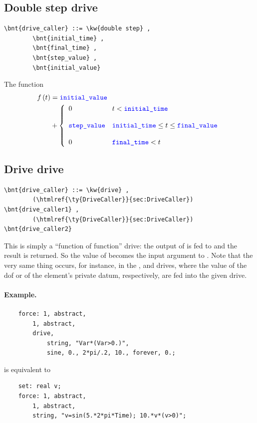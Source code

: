 \subsection{Double step drive}
\begin{Verbatim}[commandchars=\\\{\}]
    \bnt{drive_caller} ::= \kw{double step} ,
        \bnt{initial_time} , 
        \bnt{final_time} ,
        \bnt{step_value} , 
        \bnt{initial_value}
\end{Verbatim}
The function
\begin{align}
	f\plbr{t} &= \nt{initial\_value} \nonumber \\
	&+ \lcubr{\matr{ll}{
		0
			& t < \nt{initial\_time} \\
		\\
		\nt{step\_value}
			& \nt{initial\_time} \le t \le \nt{final\_value} \\
		\\
		0 
			& \nt{final\_time} < t
	}}
\end{align}

\subsection{Drive drive}
\begin{Verbatim}[commandchars=\\\{\}]
    \bnt{drive_caller} ::= \kw{drive} ,
        (\htmlref{\ty{DriveCaller}}{sec:DriveCaller}) \bnt{drive_caller1} , 
        (\htmlref{\ty{DriveCaller}}{sec:DriveCaller}) \bnt{drive_caller2}
\end{Verbatim}
This is simply a ``function of function'' drive: the output 
of  is fed to 
and the result is returned.
So the value of  becomes the input argument
to .
Note that the very same thing occurs, for instance, in the
,  and  drives, where the value of the dof
or of the element's private datum, respectively, are fed 
into the given drive.

\paragraph{Example.}
\begin{verbatim}
    force: 1, abstract,
        1, abstract,
        drive,
            string, "Var*(Var>0.)",
            sine, 0., 2*pi/.2, 10., forever, 0.;
\end{verbatim}
is equivalent to
\begin{verbatim}
    set: real v;
    force: 1, abstract,
        1, abstract,
        string, "v=sin(5.*2*pi*Time); 10.*v*(v>0)";
\end{verbatim}

